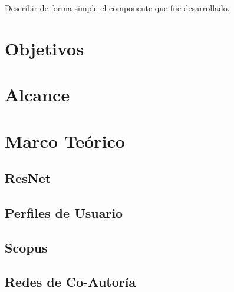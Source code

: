 Describir de forma simple el componente que fue desarrollado. 

\section{Objetivos}
\label{chapter01-section01:Objetivos}


\section{Alcance}
\label{chapter01-section02:alcance}


\section{Marco Teórico}
\label{chapter01-section03:marcoTeorico}
\subsection{ResNet}
\label{chapter01-section03:ResNet}

\subsection{Perfiles de Usuario}
\label{chapter01-section03:Perfiles de Usuario}


\subsection{Scopus}
\label{chapter01-section03:Scopus}


\subsection{Redes de Co-Autoría}
\label{chapter01-section03:Redes de Co-Autoria}


